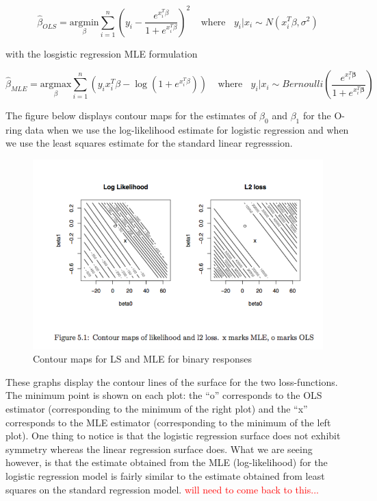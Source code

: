 $$\hat{\beta}_{OLS} = \underset{\beta}{\text{argmin}} \sum_{i=1}^n \left(y_i -  \frac{e^{x_i^T \beta}}{1 + e^{x_i^T \beta}}\right)^2 ~~~~~ \text{where} ~~~~ y_i | x_i \sim N(x_i^T\beta, \sigma^2)$$

with the losgistic regression MLE formulation

$$\hat{\beta}_{MLE} = \underset{\beta}{\text{argmax}}\sum_{i=1}^n \left( y_i x_i^T \beta - \log \left( 1 + e^{x_i^T \beta} \right) \right) ~~~~~ \text{where} ~~~~ y_i | x_i \sim Bernoulli\left(\frac{e^{x_i^T \boldsymbol{\beta}} }{1 + e^{x_i^T \boldsymbol{\beta}}}\right)$$


The figure below displays contour maps for the estimates of $\beta_0$ and $\beta_1$ for the O-ring data when we use the log-likelihood estimate for logistic regression and when we use the least squares estimate for the standard linear regresssion. 



\begin{figure}[H]
\begin{center}
\includegraphics[scale=0.5]{ls_vs_mle.png}
\end{center}
\caption{Contour maps for LS and MLE for binary responses}
\label{fig:ls_vs_mle}
\end{figure}

These graphs display the contour lines of the surface for the two loss-functions. The minimum point is shown on each plot: the ``o'' corresponds to the OLS estimator (corresponding to the minimum of the right plot) and the ``x'' corresponds to the MLE estimator (corresponding to the minimum of the left plot). One thing to notice is that the logistic regression surface does not exhibit symmetry whereas the linear regression surface does. What we are seeing however, is that the estimate obtained from the MLE (log-likelihood) for the logistic regression model is fairly similar to the estimate obtained from least squares on the standard regression model. \textcolor{red}{will need to come back to this...}






